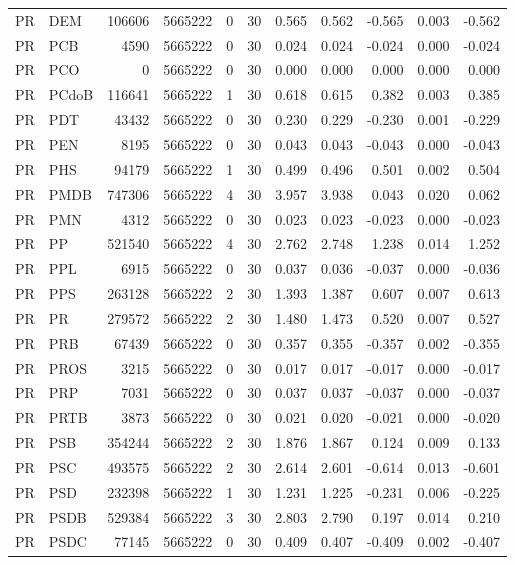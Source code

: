 \begin{landscape}
\begin{longtable}{llrrrrrrrrr}
PR & DEM & 106606 & 5665222 & 0 & 30 & 0.565 & 0.562 & -0.565 & 0.003 & -0.562 \\
PR & PCB & 4590 & 5665222 & 0 & 30 & 0.024 & 0.024 & -0.024 & 0.000 & -0.024 \\
PR & PCO & 0 & 5665222 & 0 & 30 & 0.000 & 0.000 & 0.000 & 0.000 & 0.000 \\
PR & PCdoB & 116641 & 5665222 & 1 & 30 & 0.618 & 0.615 & 0.382 & 0.003 & 0.385 \\
PR & PDT & 43432 & 5665222 & 0 & 30 & 0.230 & 0.229 & -0.230 & 0.001 & -0.229 \\
PR & PEN & 8195 & 5665222 & 0 & 30 & 0.043 & 0.043 & -0.043 & 0.000 & -0.043 \\
PR & PHS & 94179 & 5665222 & 1 & 30 & 0.499 & 0.496 & 0.501 & 0.002 & 0.504 \\
PR & PMDB & 747306 & 5665222 & 4 & 30 & 3.957 & 3.938 & 0.043 & 0.020 & 0.062 \\
PR & PMN & 4312 & 5665222 & 0 & 30 & 0.023 & 0.023 & -0.023 & 0.000 & -0.023 \\
PR & PP & 521540 & 5665222 & 4 & 30 & 2.762 & 2.748 & 1.238 & 0.014 & 1.252 \\
PR & PPL & 6915 & 5665222 & 0 & 30 & 0.037 & 0.036 & -0.037 & 0.000 & -0.036 \\
PR & PPS & 263128 & 5665222 & 2 & 30 & 1.393 & 1.387 & 0.607 & 0.007 & 0.613 \\
PR & PR & 279572 & 5665222 & 2 & 30 & 1.480 & 1.473 & 0.520 & 0.007 & 0.527 \\
PR & PRB & 67439 & 5665222 & 0 & 30 & 0.357 & 0.355 & -0.357 & 0.002 & -0.355 \\
PR & PROS & 3215 & 5665222 & 0 & 30 & 0.017 & 0.017 & -0.017 & 0.000 & -0.017 \\
PR & PRP & 7031 & 5665222 & 0 & 30 & 0.037 & 0.037 & -0.037 & 0.000 & -0.037 \\
PR & PRTB & 3873 & 5665222 & 0 & 30 & 0.021 & 0.020 & -0.021 & 0.000 & -0.020 \\
PR & PSB & 354244 & 5665222 & 2 & 30 & 1.876 & 1.867 & 0.124 & 0.009 & 0.133 \\
PR & PSC & 493575 & 5665222 & 2 & 30 & 2.614 & 2.601 & -0.614 & 0.013 & -0.601 \\
PR & PSD & 232398 & 5665222 & 1 & 30 & 1.231 & 1.225 & -0.231 & 0.006 & -0.225 \\
PR & PSDB & 529384 & 5665222 & 3 & 30 & 2.803 & 2.790 & 0.197 & 0.014 & 0.210 \\
PR & PSDC & 77145 & 5665222 & 0 & 30 & 0.409 & 0.407 & -0.409 & 0.002 & -0.407 \\

\end{longtable}
\end{landscape}
